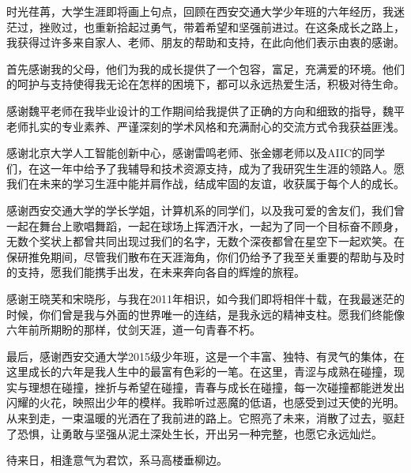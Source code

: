时光荏苒，大学生涯即将画上句点，回顾在西安交通大学少年班的六年经历，我迷茫过，挫败过，也重新拾起过勇气，带着希望和坚强前进过。在这条成长之路上，我获得过许多来自家人、老师、朋友的帮助和支持，在此向他们表示由衷的感谢。

首先感谢我的父母，他们为我的成长提供了一个包容，富足，充满爱的环境。他们的呵护与支持使得我无论在怎样的困境下，都可以永远热爱生活，积极对待生命。

感谢魏平老师在我毕业设计的工作期间给我提供了正确的方向和细致的指导，魏平老师扎实的专业素养、严谨深刻的学术风格和充满耐心的交流方式令我获益匪浅。

感谢北京大学人工智能创新中心，感谢雷鸣老师、张金娜老师以及AIIC的同学们，在这一年中给予了我辅导和技术资源支持，成为了我研究生生涯的领路人。愿我们在未来的学习生涯中能并肩作战，结成牢固的友谊，收获属于每个人的成长。

感谢西安交通大学的学长学姐，计算机系的同学们，以及我可爱的舍友们，我们曾一起在舞台上歌唱舞蹈，一起在球场上挥洒汗水，一起为了同一个目标奋不顾身，无数个奖状上都曾共同出现过我们的名字，无数个深夜都曾在星空下一起欢笑。在保研推免期间，尽管我们散布在天涯海角，你们仍给予了我至关重要的帮助与及时的支持，愿我们能携手出发，在未来奔向各自的辉煌的旅程。

感谢王晓芙和宋晓彤，与我在2011年相识，如今我们即将相伴十载，在我最迷茫的时候，你们曾是我与外面的世界唯一的连结，是我永远的精神支柱。愿我们终能像六年前所期盼的那样，仗剑天涯，道一句青春不朽。

最后，感谢西安交通大学2015级少年班，这是一个丰富、独特、有灵气的集体，在这里成长的六年是我人生中的最富有色彩的一笔。在这里，青涩与成熟在碰撞，现实与理想在碰撞，挫折与希望在碰撞，青春与成长在碰撞，每一次碰撞都能迸发出闪耀的火花，映照出少年的模样。我聆听过恶魔的低语，也感受到过天使的光明。从来到走，一束温暖的光洒在了我前进的路上。它照亮了未来，消散了过去，驱赶了恐惧，让勇敢与坚强从泥土深处生长，开出另一种完整，也愿它永远灿烂。

待来日，相逢意气为君饮，系马高楼垂柳边。

